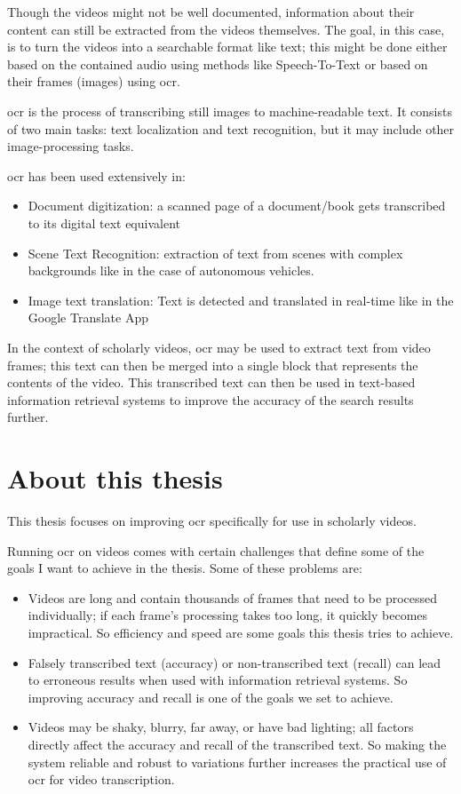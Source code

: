 Though the videos might not be well documented, information about their content can still be extracted from the videos themselves. The goal, in this case, is to turn the videos into a searchable format like text; this might be done either based on the contained audio using methods like Speech-To-Text or based on their frames (images) using \gls{ocr}.

\gls{ocr} is the process of transcribing still images to machine-readable text. It consists of two main tasks: text localization and text recognition, but it may include other image-processing tasks.


\gls{ocr} has been used extensively in:
\begin{itemize}
    \item Document digitization: a scanned page of a document/book gets transcribed to its digital text equivalent
    \item Scene Text Recognition: extraction of text from scenes with complex backgrounds like in the case of autonomous vehicles.
    \item Image text translation: Text is detected and translated in real-time like in the Google Translate App
\end{itemize}

In the context of scholarly videos, \gls{ocr} may be used to extract text from video frames; this text can then be merged into a single block that represents the contents of the video.
This transcribed text can then be used in text-based information retrieval systems to improve the accuracy of the search results further.

\section{About this thesis}

This thesis focuses on improving \gls{ocr} specifically for use in scholarly videos.

Running \gls{ocr} on videos comes with certain challenges that define some of the goals I want to achieve in the thesis. Some of these problems are:
\begin{itemize}
    \item Videos are long and contain thousands of frames that need to be processed individually; if each frame's processing takes too long, it quickly becomes impractical.
    So efficiency and speed are some goals this thesis tries to achieve.
    \item Falsely transcribed text (accuracy) or non-transcribed text (recall) can lead to erroneous results when used with information retrieval systems. So improving accuracy and recall is one of the goals we set to achieve.
    \item Videos may be shaky, blurry, far away, or have bad lighting; all factors directly affect the accuracy and recall of the transcribed text. So making the system reliable and robust to variations further increases the practical use of \gls{ocr} for video transcription.
\end{itemize}